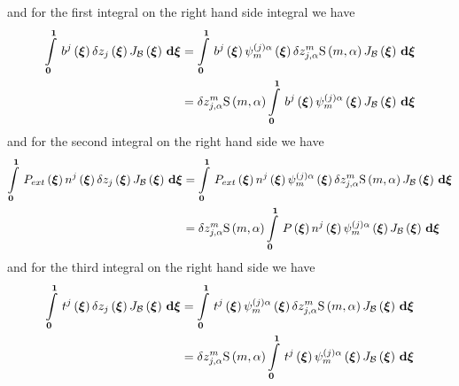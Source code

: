 and for the first integral on the right hand side integral we have
\begin{equation}
  \begin{split}
    \gint{\vectr{0}}{\vectr{1}}{\fnof{b^{j}}{\vectr{\xi}}\variationdir{
        \fnof{z_{j}}{\vectr{\xi}}}\fnof{J_{\embedmanifold{B}}}{\vectr{\xi}}}{\vectr{\xi}}
    &= \gint{\vectr{0}}{\vectr{1}}{\fnof{b^{j}}{\vectr{\xi}}
      \idxgbfn{\pbrac{j}}{m}{\alpha}{\vectr{\xi}}\variationdir{z_{j,\alpha}^{m}}\gsf{m}{\alpha}
      \fnof{J_{\embedmanifold{B}}}{\vectr{\xi}}}{\vectr{\xi}} \\ &=
    \variationdir{z_{j,\alpha}^{m}}\gsf{m}{\alpha}\gint{\vectr{0}}{\vectr{1}}{\fnof{b^{j}}{\vectr{\xi}}
      \idxgbfn{\pbrac{j}}{m}{\alpha}{\vectr{\xi}}
      \fnof{J_{\embedmanifold{B}}}{\vectr{\xi}}}{\vectr{\xi}}
  \end{split}
\end{equation}
and for the second integral on the right hand side we have
\begin{equation}
  \begin{split}
    \gint{\vectr{0}}{\vectr{1}}{\fnof{P_{ext}}{\vectr{\xi}}\fnof{n^{j}}{\vectr{\xi}}\variationdir{
      \fnof{z_{j}}{\vectr{\xi}}}\fnof{J_{\embedmanifold{B}}}{\vectr{\xi}}}{\vectr{\xi}}
    &= \gint{\vectr{0}}{\vectr{1}}{\fnof{P_{ext}}{\vectr{\xi}}\fnof{n^{j}}{\vectr{\xi}}
      \idxgbfn{\pbrac{j}}{m}{\alpha}{\vectr{\xi}}\variationdir{z_{j,\alpha}^{m}}\gsf{m}{\alpha}
      \fnof{J_{\embedmanifold{B}}}{\vectr{\xi}}}{\vectr{\xi}}
    \\
    &= \variationdir{z_{j,\alpha}^{m}}\gsf{m}{\alpha}\gint{\vectr{0}}{\vectr{1}}{\fnof{P}{\vectr{\xi}}\fnof{n^{j}}{\vectr{\xi}}
      \idxgbfn{\pbrac{j}}{m}{\alpha}{\vectr{\xi}}
      \fnof{J_{\embedmanifold{B}}}{\vectr{\xi}}}{\vectr{\xi}}
  \end{split}
\end{equation}
and for the third integral on the right hand side we have
\begin{equation}
  \begin{split}
    \gint{\vectr{0}}{\vectr{1}}{\fnof{t^{j}}{\vectr{\xi}}\variationdir{
      \fnof{z_{j}}{\vectr{\xi}}}\fnof{J_{\embedmanifold{B}}}{\vectr{\xi}}}{\vectr{\xi}}
    &= \gint{\vectr{0}}{\vectr{1}}{\fnof{t^{j}}{\vectr{\xi}}
      \idxgbfn{\pbrac{j}}{m}{\alpha}{\vectr{\xi}}\variationdir{
      z_{j,\alpha}^{m}}\gsf{m}{\alpha}
      \fnof{J_{\embedmanifold{B}}}{\vectr{\xi}}}{\vectr{\xi}} \\
    &=
    \variationdir{z_{j,\alpha}^{m}}\gsf{m}{\alpha}\gint{\vectr{0}}{\vectr{1}}{\fnof{t^{j}}{\vectr{\xi}}
      \idxgbfn{\pbrac{j}}{m}{\alpha}{\vectr{\xi}}
      \fnof{J_{\embedmanifold{B}}}{\vectr{\xi}}}{\vectr{\xi}}
  \end{split}
\end{equation}


